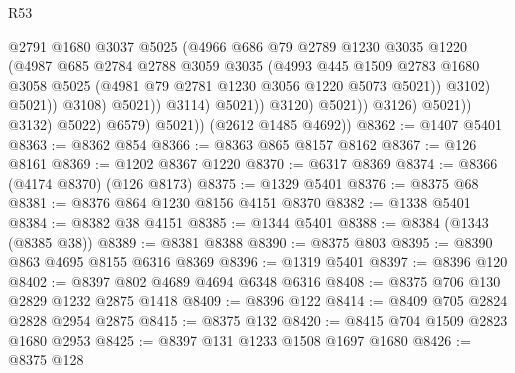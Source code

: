 \begin{lexlean}{R53}
\begin{coremodule}
                                          @2791
                                          @1680
                                          @3037
                                          @5025
                                          (@4966
                                            @686
                                            @79
                                            @2789
                                            @1230
                                            @3035
                                            @1220
                                            (@4987
                                              @685
                                              @2784
                                              @2788
                                              @3059
                                              @3035
                                              (@4993
                                                @445
                                                @1509
                                                @2783
                                                @1680
                                                @3058
                                                @5025
                                                (@4981 @79 @2781 @1230 @3056 @1220 @5073 @5021))
                                              @3102)
                                            @5021))
                                        @3108)
                                      @5021))
                                  @3114)
                                @5021))
                            @3120)
                          @5021))
                      @3126)
                    @5021))
                @3132)
              @5022)
            @6579)
          @5021))
      (@2612 @1485 @4692))
@8362 := @1407 @5401
@8363 := @8362 @854
@8366 := @8363 @865 @8157 @8162
@8367 := @126 @8161
@8369 := @1202 @8367 @1220
@8370 := @6317 @8369
@8374 := @8366 (@4174 @8370) (@126 @8173)
@8375 := @1329 @5401
@8376 := @8375 @68
@8381 := @8376 @864 @1230 @8156 @4151 @8370
@8382 := @1338 @5401
@8384 := @8382 @38 @4151
@8385 := @1344 @5401
@8388 := @8384 (@1343 (@8385 @38))
@8389 := @8381 @8388
@8390 := @8375 @803
@8395 := @8390 @863 @4695 @8155 @6316 @8369
@8396 := @1319 @5401
@8397 := @8396 @120
@8402 := @8397 @802 @4689 @4694 @6348 @6316
@8408 := @8375 @706 @130 @2829 @1232 @2875 @1418
@8409 := @8396 @122
@8414 := @8409 @705 @2824 @2828 @2954 @2875
@8415 := @8375 @132
@8420 := @8415 @704 @1509 @2823 @1680 @2953
@8425 := @8397 @131 @1233 @1508 @1697 @1680
@8426 := @8375 @128

\end{coremodule}
\end{lexlean}
